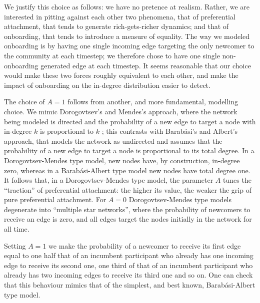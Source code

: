 \documentclass{bmcart}
\begin{document}
We justify this choice as follows: we have no pretence at realism. Rather, we are interested in pitting against each other two phenomena, that of preferential attachment, that tends to generate rich-gets-richer dynamics; and that of onboarding, that tends to introduce a measure of equality. The way we modeled onboarding is by having one single incoming edge targeting the only newcomer to the community at each timestep; we therefore chose to have one single non-onboarding generated edge at each timestep. It seems reasonable that our choice would make  these two forces roughly equivalent to each other, and make the impact of onboarding on the in-degree distribution easier to detect. 


The choice of $A=1$ follows from another, and more fundamental, modelling choice. We mimic Dorogovtsev's and Mendes's approach, where the network being modeled is directed and the probability of a new edge to target a node with in-degree $k$ is proportional to $k$ \cite{dorogovtsev2002evolution}; this contrasts with Barab\'asi's and Albert's approach, that models the network as undirected and assumes that the probability of a new edge to target a node is proportional to its total degree. In a Dorogovtsev-Mendes type model, new nodes have, by construction, in-degree zero, whereas in a Barab\'asi-Albert type model new nodes have total degree one. It follows that, in a Dorogovtsev-Mendes type model, the parameter $A$ tunes the ``traction'' of preferential attachment: the higher its value, the weaker the grip of pure preferential attachment. For $A=0$ Dorogovtsev-Mendes type models degenerate into ``multiple star networks'', where the probability of newcomers to receive an edge is zero, and all edges target the nodes initially in the network for all time. 

Setting $A = 1$ we make the probability of a newcomer to receive its first edge equal to one half that of an incumbent participant who already has one incoming edge to receive its second one, one third of that of an incumbent participant who already has two incoming edges to receive its third one and so on. One can check that this behaviour mimics that of the simplest, and best known, Barab\'asi-Albert type model. 

\end{document}
